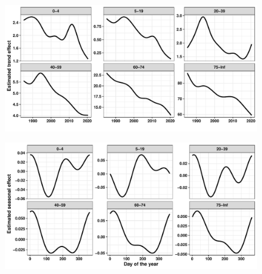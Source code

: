 \documentclass[11pt]{article}
\begin{document}
\begin{suppfigure}[ht]
	\centering
	\begin{subfigure}[t]{0.49\linewidth}
		\centering
		\includegraphics[width=1\linewidth]{figs/supp-figure-1a.pdf} 
		\caption{} 
		\label{supp-fig:trend}
	\end{subfigure}
	\hfill
	\begin{subfigure}[t]{0.49\linewidth}
		\centering
		\includegraphics[width=1\linewidth]{figs//supp-figure-1b.pdf}
		\caption{} 
		\label{supp-fig:seasonal}
	\end{subfigure}
	\caption{}
	\label{supp-fig:model-components}
\end{suppfigure}
\end{document}
